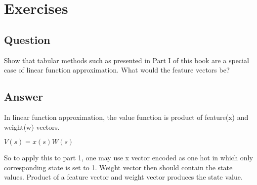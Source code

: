 \documentclass[11pt]{article}
\begin{document}
    \maketitle
    \setcounter{section}{8}


    \section{Exercises}

    \subsection{Question}

    Show that tabular methods such as presented in Part I of this book are a special case of linear function approximation.
    What would the feature vectors be?

    \subsection*{Answer}

    In linear function approximation, the value function is product of feature(x) and weight(w) vectors.

    \noindention $ V(s) = x(s) W(s)$

    So to apply this to part 1, one may use x vector encoded as one hot in which only corresponding state is set to 1.
    Weight vector then should contain the state values.
    Product of a feature vector and weight vector produces the state value.
\end{document}
